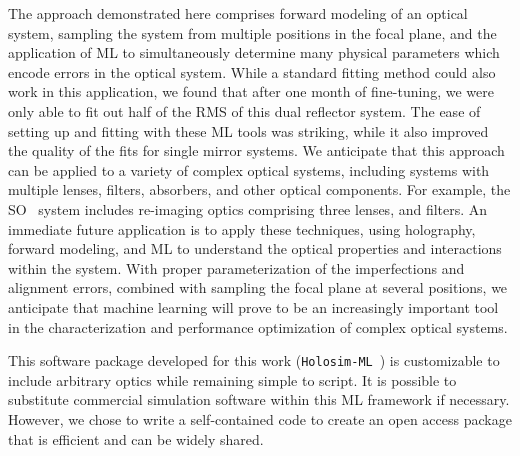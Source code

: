 The approach demonstrated here comprises forward modeling of an optical system, sampling the system from multiple positions in the focal plane, and the application of ML to simultaneously determine many physical parameters which encode errors in the optical system.  While a standard fitting method could also work in this application, we found that after one month of fine-tuning, we were only able to fit out half of the RMS of this dual reflector system.  The ease of setting up and fitting with these ML tools was striking, while it also improved the quality of the fits for single mirror systems.  We anticipate that this approach can be applied to a variety of complex optical systems, including systems with multiple lenses, filters, absorbers, and other optical components.  For example, the SO~\cite{gali18} system includes re-imaging optics comprising three lenses, and filters.  An immediate future application is to apply these techniques, using holography, forward modeling, and ML to understand the optical properties and interactions within the system.  With proper parameterization of the imperfections and alignment errors, combined with sampling the focal plane at several positions, we anticipate that machine learning will prove to be an increasingly important tool in the characterization and performance optimization of complex optical systems. 

This software package developed for this work (\verb|Holosim-ML|~\cite{McMahonCosmologyLab}) is customizable to include arbitrary optics while remaining simple to script.  It is possible to substitute commercial simulation software within this ML framework if necessary.  However, we chose to write a self-contained code to create an open access package that is efficient and can be widely shared.
